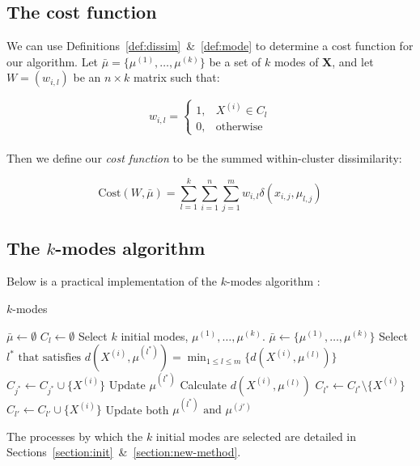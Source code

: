 \subsection{The cost function}\label{subsection:cost}

We can use Definitions~\ref{def:dissim}~\&~\ref{def:mode} to determine a cost 
function for our algorithm. Let \(\bar{\mu} = \{\mu^{(1)}, \ldots, \mu^{(k)}\}\) 
be a set of \(k\) modes of \textbf{X}, and let \(W = (w_{i,l})\) be an \(n 
\times k\) matrix such that:

\[ 
    w_{i,l} = \begin{cases}
                1, & X^{(i)} \in C_l \\
                0, & \text{otherwise}
              \end{cases}
\]\\

Then we define our \emph{cost function} to be the summed within-cluster 
dissimilarity:

\begin{equation}
    \text{Cost}(W, \bar{\mu}) = \sum_{l=1}^{k} \sum_{i=1}^{n} 
                                \sum_{j=1}^{m} w_{i,l} 
                                \delta(x_{i,j}, \mu_{l,j})
\end{equation}


\subsection{The \(k\)-modes algorithm}\label{subsection:kmodes}

Below is a practical implementation of the \(k\)-modes algorithm \cite{Huang98}:

\begin{algorithm}[H]
    \caption{\(k\)-modes}\label{alg:kmodes}
	\begin{algorithmic}[0] 
        \State \(\bar{\mu} \gets \emptyset\)
            \State \(C_l \gets \emptyset\)
		\EndFor
        \State Select \(k\) initial modes, \(\mu^{(1)}, \ldots, \mu^{(k)}\).
        \State \(\bar{\mu} \gets \{\mu^{(1)}, \ldots, \mu^{(k)}\}\)
            \State Select \(l^* \text{ that satisfies } \displaystyle{d(X^{(i)}, 
                \mu^{(l^*)}) = \min_{1 \le l \le m} \{d(X^{(i)}, \mu^{(l)})\}}\)
            \State \(C_{j^*} \gets C_{j^*} \cup \{X^{(i)}\}\)
            \State Update \(\mu^{(l^*)}\)
		\EndFor
		\Repeat
                    \State Calculate \(d(X^{(i)}, \mu^{(l)})\)
				\EndFor
                    \State \(C_{l^*} \gets C_{l^*} \setminus \{X^{(i)}\}\)
                    \State \(C_{l'} \gets C_{l'} \cup \{X^{(i)}\}\)
                    \State Update both \(\mu^{(l^*)} \text{ and } \mu^{(j')}\)
				\EndIf
			\EndFor
	\end{algorithmic}
\end{algorithm}

\begin{remark}
    The processes by which the \(k\) initial modes are selected are detailed in 
    Sections~\ref{section:init}~\&~\ref{section:new-method}.
\end{remark}

